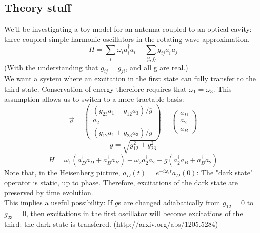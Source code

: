 \documentclass[final]{article}
\begin{document}
\subsection*{Theory stuff}
We'll be investigating a toy model for an antenna coupled to an optical cavity: three coupled simple harmonic oscillators in the rotating wave approximation.
\[H=\sum_i \omega_i a_i^\dagger a_i-\sum_{\langle i,j\rangle} g_{ij} a_i^\dagger a_j\]
(With the understanding that \(g_{ij}=g_{ji}\), and all g are real.)\\
We want a system where an excitation in the first state can fully transfer to the third state. Conservation of energy therefore requires that \(\omega_1=\omega_3\).
This assumption allows us to switch to a more tractable basis:
\[\vec a=\begin{pmatrix}(g_{23}a_1-g_{12}a_3)/\bar g\\a_2\\(g_{12}a_1+g_{23}a_3)/\bar g\end{pmatrix}=\begin{pmatrix}a_D\\a_2\\a_B\end{pmatrix}\]
\[\bar g=\sqrt{g_{12}^2+g_{23}^2}\]
\[H=\omega_1\left(a_D^\dagger a_D+a_B^\dagger a_B\right)+\omega_2a_2^\dagger a_2-\bar g\left(a_2^\dagger a_B+a_B^\dagger a_2\right)\]
Note that, in the Heisenberg picture, \(a_D(t)=e^{-i\omega_1 t} a_D(0)\): The "dark state" operator is static, up to phase. Therefore, excitations of the dark state are preserved by time evolution.\\
This implies a useful possibility: If \(g\)s are changed adiabatically from \(g_{12}=0\) to \(g_{23}=0\), then excitations in the first oscillator will become excitations of the third: the dark state is transfered. (http://arxiv.org/abs/1205.5284)
\end{document}
